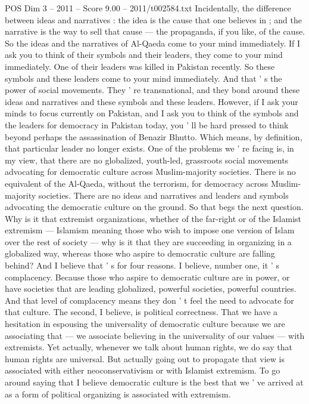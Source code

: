 \begin{textsample}{POS Dim 3 – 2011 – Score 9.00 – 2011/t002584.txt}
Incidentally, the difference between ideas and narratives : the idea is the cause that one believes in ; and the narrative is the way to sell that cause — the propaganda, if you like, of the cause.
So the ideas and the narratives of Al-Qaeda come to your mind immediately.
If I ask you to think of their symbols and their leaders, they come to your mind immediately.
One of their leaders was killed in Pakistan recently.
So these symbols and these leaders come to your mind immediately.
And that ' s the power of social movements.
They ' re transnational, and they bond around these ideas and narratives and these symbols and these leaders.
However, if I ask your minds to focus currently on Pakistan, and I ask you to think of the symbols and the leaders for democracy in Pakistan today, you ' ll be hard pressed to think beyond perhaps the assassination of Benazir Bhutto.
Which means, by definition, that particular leader no longer exists.
One of the problems we ' re facing is, in my view, that there are no globalized, youth-led, grassroots social movements advocating for democratic culture across Muslim-majority societies.
There is no equivalent of the Al-Qaeda, without the terrorism, for democracy across Muslim-majority societies.
There are no ideas and narratives and leaders and symbols advocating the democratic culture on the ground.
So that begs the next question.
Why is it that extremist organizations, whether of the far-right or of the Islamist extremism — Islamism meaning those who wish to impose one version of Islam over the rest of society — why is it that they are succeeding in organizing in a globalized way, whereas those who aspire to democratic culture are falling behind?
And I believe that ' s for four reasons.
I believe, number one, it ' s complacency.
Because those who aspire to democratic culture are in power, or have societies that are leading globalized, powerful societies, powerful countries.
And that level of complacency means they don ' t feel the need to advocate for that culture.
The second, I believe, is political correctness.
That we have a hesitation in espousing the universality of democratic culture because we are associating that — we associate believing in the universality of our values — with extremists.
Yet actually, whenever we talk about human rights, we do say that human rights are universal.
But actually going out to propagate that view is associated with either neoconservativism or with Islamist extremism.
To go around saying that I believe democratic culture is the best that we ' ve arrived at as a form of political organizing is associated with extremism.

\end{textsample}
